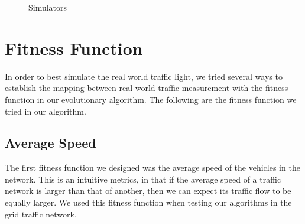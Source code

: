 \documentclass{article} %
\begin{document}
\begin{figure}[h]
 \centering
  \caption{Simulators}
   \label{fig:simulator} %
\end{figure}


\section{Fitness Function}
In order to best simulate the real world traffic light, we tried several ways to establish the mapping between real world traffic measurement with the fitness function in our evolutionary algorithm. The following are the fitness function we tried in our algorithm.
\subsection{Average Speed}
The first fitness function we designed was the average speed of the vehicles in the network. This is an intuitive metrics, in that if the average speed of a traffic network is larger than that of another, then we can expect its traffic flow to be equally larger. We used this fitness function when testing our algorithms in the grid traffic network.%
\end{document}
